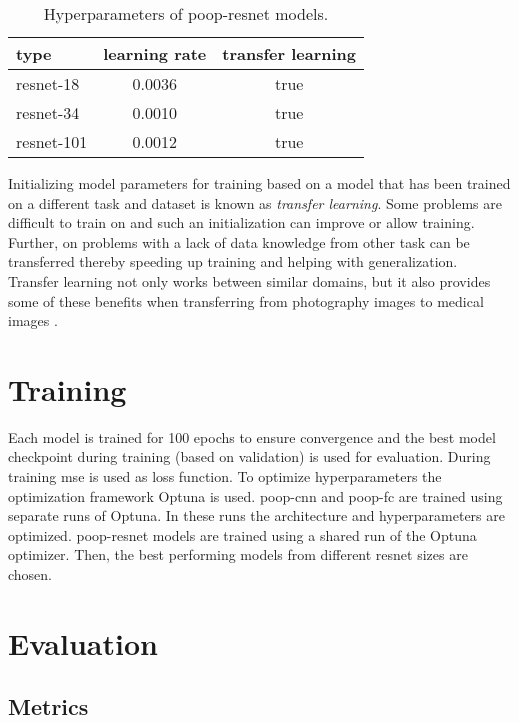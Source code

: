 \begin{table}[ht]
    \centering
    \caption[\Acs{poop}-\acs{resnet} hyperparameters]{Hyperparameters of \acs{poop}-\acs{resnet} models.}
    \begin{tabular}{ l c c }
        \hline
        type & learning rate & transfer learning\\
        \hline
        \acs{resnet}-18  & 0.0036 & true \\
        \acs{resnet}-34  & 0.0010 & true \\
        \acs{resnet}-101 & 0.0012 & true \\
    \end{tabular}
    \label{tab:Methods:Models:Comparison}
\end{table}

Initializing model parameters for training based on a model that has been trained on a different task and dataset is known as \emph{transfer learning}. Some problems are difficult to train on and such an initialization can improve or allow training. Further, on problems with a lack of data knowledge from other task can be transferred thereby speeding up training and helping with generalization. Transfer learning not only works between similar domains, but it also provides some of these benefits when transferring from photography images to medical images \cite{mustafa2021supervised}.


\section{Training}
\label{sec:Methods:Training}

Each model is trained for 100 epochs to ensure convergence and the best model checkpoint during training (based on validation) is used for evaluation. During training \ac{mse} is used as loss function. To optimize hyperparameters the optimization framework Optuna \cite{optuna} is used.
\Acs{poop}-\acs{cnn} and \acs{poop}-\acs{fc} are trained using separate runs of Optuna. In these runs the architecture and hyperparameters are optimized.
\Acs{poop}-\acs{resnet} models are trained using a shared run of the Optuna optimizer. Then, the best performing models from different \acs{resnet} sizes are chosen.

\section{Evaluation}
\label{sec:Methods:Evaluation}

\subsection{Metrics}
\label{sec:Methods:Evaluation:Metrics}

